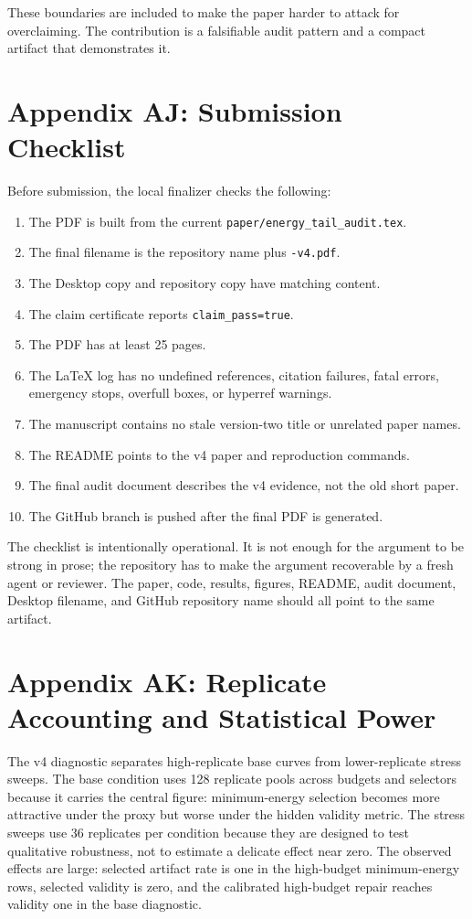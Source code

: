 \documentclass{article}
\begin{document}
These boundaries are included to make the paper harder to attack for
overclaiming. The contribution is a falsifiable audit pattern and a compact
artifact that demonstrates it.

\section*{Appendix AJ: Submission Checklist}

Before submission, the local finalizer checks the following:
\begin{enumerate}
  \item The PDF is built from the current \texttt{paper/energy\_tail\_audit.tex}.
  \item The final filename is the repository name plus \texttt{-v4.pdf}.
  \item The Desktop copy and repository copy have matching content.
  \item The claim certificate reports \texttt{claim\_pass=true}.
  \item The PDF has at least 25 pages.
  \item The LaTeX log has no undefined references, citation failures,
  fatal errors, emergency stops, overfull boxes, or hyperref warnings.
  \item The manuscript contains no stale version-two title or unrelated paper
  names.
  \item The README points to the v4 paper and reproduction commands.
  \item The final audit document describes the v4 evidence, not the old short
  paper.
  \item The GitHub branch is pushed after the final PDF is generated.
\end{enumerate}

The checklist is intentionally operational. It is not enough for the argument
to be strong in prose; the repository has to make the argument recoverable by a
fresh agent or reviewer. The paper, code, results, figures, README, audit
document, Desktop filename, and GitHub repository name should all point to the
same artifact.

\section*{Appendix AK: Replicate Accounting and Statistical Power}

The v4 diagnostic separates high-replicate base curves from lower-replicate
stress sweeps. The base condition uses 128 replicate pools across budgets and
selectors because it carries the central figure: minimum-energy selection
becomes more attractive under the proxy but worse under the hidden validity
metric. The stress sweeps use 36 replicates per condition because they are
designed to test qualitative robustness, not to estimate a delicate effect
near zero. The observed effects are large: selected artifact rate is one in
the high-budget minimum-energy rows, selected validity is zero, and the
calibrated high-budget repair reaches validity one in the base diagnostic.
\end{document}
